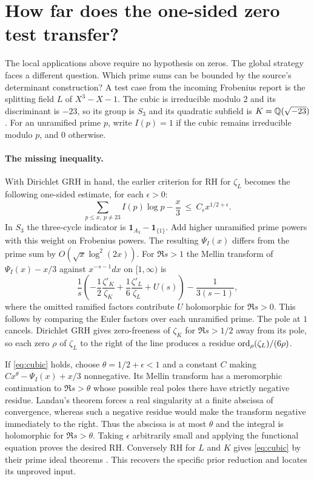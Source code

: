 \section{How far does the one-sided zero test transfer?}
The local applications above require no hypothesis on zeros. The global strategy faces a different question. Which prime sums can be bounded by the source's determinant construction? A test case from the incoming Frobenius report \cite{oldcubic} is the splitting field $L$ of $X^3-X-1$. The cubic is irreducible modulo $2$ and its discriminant is $-23$, so its group is $S_3$ and its quadratic subfield is $K=\mathbb Q(\sqrt{-23})$. For an unramified prime $p$, write $I(p)=1$ if the cubic remains irreducible modulo $p$, and $0$ otherwise.

\paragraph{The missing inequality.}
With Dirichlet GRH in hand, the earlier criterion for RH for $\zeta_L$ becomes the following one-sided estimate, for each $\epsilon>0$:
\begin{equation}
        \sum_{p\le x,\ p\ne23} I(p)\log p-\frac{x}{3}
           \ \le\ C_\epsilon x^{1/2+\epsilon}.                    \label{eq:cubic}
\end{equation}
In $S_3$ the three-cycle indicator is $\mathbf1_{A_3}-\mathbf1_{\{1\}}$. Add higher unramified prime powers with this weight on Frobenius powers. The resulting $\Psi_I(x)$ differs from the prime sum by $O(\sqrt{x}\log^2(2x))$. For $\Re s>1$ the Mellin transform of $\Psi_I(x)-x/3$ against $x^{-s-1}dx$ on $[1,\infty)$ is
\[
 \frac1s\left(-\frac12\frac{\zeta'_K}{\zeta_K}
                 +\frac16\frac{\zeta'_L}{\zeta_L}+U(s)\right)
                 -\frac{1}{3(s-1)},
\]
where the omitted ramified factors contribute $U$ holomorphic for $\Re s>0$. This follows by comparing the Euler factors over each unramified prime. The pole at $1$ cancels. Dirichlet GRH gives zero-freeness of $\zeta_K$ for $\Re s>1/2$ away from its pole, so each zero $\rho$ of $\zeta_L$ to the right of the line produces a residue $\operatorname{ord}_\rho(\zeta_L)/(6\rho)$.

If \eqref{eq:cubic} holds, choose $\theta=1/2+\epsilon<1$ and a constant $C$ making $Cx^\theta-\Psi_I(x)+x/3$ nonnegative. Its Mellin transform has a meromorphic continuation to $\Re s>\theta$ whose possible real poles there have strictly negative residue. Landau's theorem forces a real singularity at a finite abscissa of convergence, whereas such a negative residue would make the transform negative immediately to the right. Thus the abscissa is at most $\theta$ and the integral is holomorphic for $\Re s>\theta$. Taking $\epsilon$ arbitrarily small and applying the functional equation proves the desired RH. Conversely RH for $L$ and $K$ gives \eqref{eq:cubic} by their prime ideal theorems \cite{gm}. This recovers the specific prior reduction and locates its unproved input.

